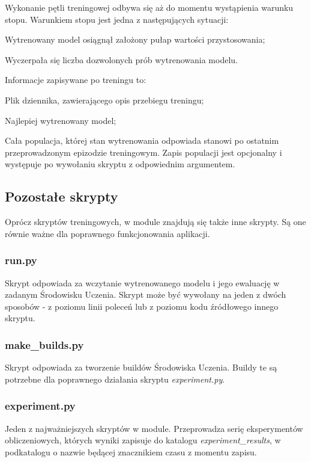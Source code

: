 Wykonanie pętli treningowej odbywa się aż do momentu wystąpienia warunku stopu. Warunkiem stopu jest jedna z następujących sytuacji:
\begin{enumerate*}
\item Wytrenowany model osiągnął założony pułap wartości przystosowania;
\item Wyczerpała się liczba dozwolonych prób wytrenowania modelu.
\end{enumerate*}
Informacje zapisywane po treningu to:
\begin{itemize*}
\item Plik dziennika, zawierającego opis przebiegu treningu;
\item Najlepiej wytrenowany model;
\item Cała populacja, której stan wytrenowania odpowiada stanowi po ostatnim przeprowadzonym epizodzie treningowym. Zapis populacji jest opcjonalny i występuje po wywołaniu skryptu z odpowiednim argumentem.
\end{itemize*}

\subsection{Pozostałe skrypty}
Oprócz skryptów treningowych, w module znajdują się także inne skrypty. Są one równie ważne dla poprawnego funkcjonowania aplikacji.

\subsubsection{run.py}
Skrypt odpowiada za wczytanie wytrenowanego modelu i jego ewaluację w zadanym Środowisku Uczenia. Skrypt może być wywołany na jeden z dwóch sposobów - z poziomu linii poleceń lub z poziomu kodu źródłowego innego skryptu.

\subsubsection{make\_builds.py}
Skrypt odpowiada za tworzenie buildów Środowiska Uczenia. Buildy te są potrzebne dla poprawnego działania skryptu \textit{experiment.py}.

\subsubsection{experiment.py}
Jeden z najważniejszych skryptów w module. Przeprowadza serię eksperymentów obliczeniowych, których wyniki zapisuje do katalogu \textit{experiment\_results}, w podkatalogu o nazwie będącej znacznikiem czasu z momentu zapisu.

